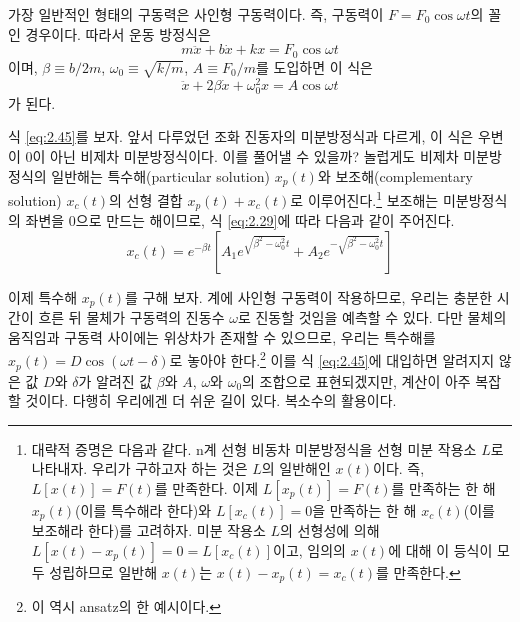 \documentclass[chapter, oneside, b5paper]{oblivoir}
\theoremstyle{plain}
\theoremstyle{definition}
\theoremstyle{remark}
\begin{document}
가장 일반적인 형태의 구동력은 사인형 구동력이다. 즉, 구동력이 $F=F_0\cos{\omega t}$의 꼴인 경우이다. 따라서 운동 방정식은
\begin{equation}
    m\ddot{x} + b\dot{x}+kx=F_0\cos{\omega t} \label{eq:2.44}
\end{equation}
이며, $\beta \equiv b/2m$, $\omega_0 \equiv \sqrt{k/m}$, $A \equiv F_0/m$를 도입하면 이 식은
\begin{equation}
    \ddot{x} + 2\beta \dot{x} + \omega_0^2x = A\cos{\omega t} \label{eq:2.45}
\end{equation}
가 된다.

식 \ref{eq:2.45}를 보자. 앞서 다루었던 조화 진동자의 미분방정식과 다르게, 이 식은 우변이 0이 아닌 비제차 미분방정식이다. 이를 풀어낼 수 있을까? 놀럽게도 비제차 미분방정식의 일반해는 특수해(particular solution) $x_p(t)$와 보조해(complementary solution) $x_c(t)$의 선형 결합 $x_p(t)+x_c(t)$로 이루어진다.\footnote{대략적 증명은 다음과 같다. n계 선형 비동차 미분방정식을 선형 미분 작용소 $L$로 나타내자. 우리가 구하고자 하는 것은 $L$의 일반해인 $x(t)$이다. 즉, $L[x(t)] = F(t)$를 만족한다. 이제 $L[x_p(t)] = F(t)$를 만족하는 한 해 $x_p(t)$(이를 특수해라 한다)와 $L[x_c(t)] = 0$을 만족하는 한 해 $x_c(t)$(이를 보조해라 한다)를 고려하자. 미분 작용소 $L$의 선형성에 의해 $L[x(t)-x_p(t)]=0=L[x_c(t)]$이고, 임의의 $x(t)$에 대해 이 등식이 모두 성립하므로 일반해 $x(t)$는 $x(t)-x_p(t)=x_c(t)$를 만족한다.} 보조해는 미분방정식의 좌변을 0으로 만드는 해이므로, 식 \ref{eq:2.29}에 따라 다음과 같이 주어진다.
\begin{equation}
    x_c(t) = e^{-\beta t}[A_1e^{\sqrt{\beta^2-\omega_0^2}t}+A_2e^{-\sqrt{\beta^2-\omega_0^2}t}] \label{eq:2.46}
\end{equation}

이제 특수해 $x_p(t)$를 구해 보자. 계에 사인형 구동력이 작용하므로, 우리는 충분한 시간이 흐른 뒤 물체가 구동력의 진동수 $\omega$로 진동할 것임을 예측할 수 있다. 다만 물체의 움직임과 구동력 사이에는 위상차가 존재할 수 있으므로, 우리는 특수해를 $x_p(t)=D\cos{(\omega t-\delta)}$로 놓아야 한다.\footnote{이 역시 ansatz의 한 예시이다.} 이를 식 \ref{eq:2.45}에 대입하면 알려지지 않은 값 $D$와 $\delta$가 알려진 값 $\beta$와 $A$, $\omega$와 $\omega_0$의 조합으로 표현되겠지만, 계산이 아주 복잡할 것이다. 다행히 우리에겐 더 쉬운 길이 있다. 복소수의 활용이다.
\end{document}
